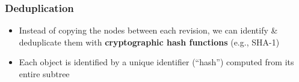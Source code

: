 \documentclass[aspectratio=169,xcolor=table]{beamer}
\begin{document}
    \begin{frame}
        \frametitle{Deduplication}
        \begin{block}{}
            \begin{itemize}
                \item Instead of copying the nodes between each revision, we
                    can identify \& deduplicate them with \textbf{cryptographic
                    hash functions} (e.g., SHA-1)
                \item Each object is identified by a unique identifier
                    (``hash'') computed from its entire subtree
            \end{itemize}
        \end{block}
        \vfill
        \begin{figure}
            \centering
            \scalebox{0.8}{}
        \end{figure}
    \end{frame}

\end{document}

